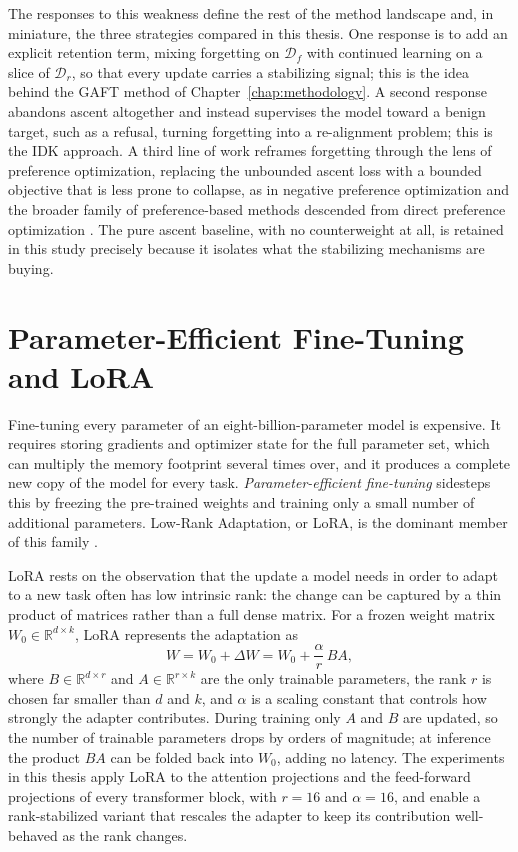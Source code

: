 \documentclass[a4paper,12pt]{report}
\begin{document}
The responses to this weakness define the rest of the method landscape and, in miniature, the three strategies compared in this thesis. One response is to add an explicit retention term, mixing forgetting on $\mathcal{D}_f$ with continued learning on a slice of $\mathcal{D}_r$, so that every update carries a stabilizing signal; this is the idea behind the GAFT method of Chapter~\ref{chap:methodology}. A second response abandons ascent altogether and instead supervises the model toward a benign target, such as a refusal, turning forgetting into a re-alignment problem; this is the IDK approach. A third line of work reframes forgetting through the lens of preference optimization, replacing the unbounded ascent loss with a bounded objective that is less prone to collapse, as in negative preference optimization \parencite{zhang2024npo} and the broader family of preference-based methods descended from direct preference optimization \parencite{rafailov2023dpo}. The pure ascent baseline, with no counterweight at all, is retained in this study precisely because it isolates what the stabilizing mechanisms are buying.

\section{Parameter-Efficient Fine-Tuning and LoRA}
\label{sec:bg-lora}
Fine-tuning every parameter of an eight-billion-parameter model is expensive. It requires storing gradients and optimizer state for the full parameter set, which can multiply the memory footprint several times over, and it produces a complete new copy of the model for every task. \emph{Parameter-efficient fine-tuning} sidesteps this by freezing the pre-trained weights and training only a small number of additional parameters. Low-Rank Adaptation, or LoRA, is the dominant member of this family \parencite{hu2022lora}.

LoRA rests on the observation that the update a model needs in order to adapt to a new task often has low intrinsic rank: the change can be captured by a thin product of matrices rather than a full dense matrix. For a frozen weight matrix $W_0 \in \mathbb{R}^{d \times k}$, LoRA represents the adaptation as
\begin{equation}
	W = W_0 + \Delta W = W_0 + \frac{\alpha}{r}\,B A,
	\label{eq:lora}
\end{equation}
where $B \in \mathbb{R}^{d \times r}$ and $A \in \mathbb{R}^{r \times k}$ are the only trainable parameters, the rank $r$ is chosen far smaller than $d$ and $k$, and $\alpha$ is a scaling constant that controls how strongly the adapter contributes. During training only $A$ and $B$ are updated, so the number of trainable parameters drops by orders of magnitude; at inference the product $BA$ can be folded back into $W_0$, adding no latency. The experiments in this thesis apply LoRA to the attention projections and the feed-forward projections of every transformer block, with $r = 16$ and $\alpha = 16$, and enable a rank-stabilized variant that rescales the adapter to keep its contribution well-behaved as the rank changes.
\end{document}
